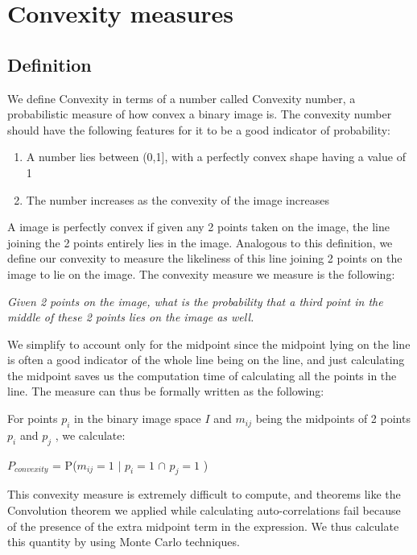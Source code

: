 \documentclass[12pt, a4paper]{report}
\begin{document}
\chapter{Convexity measures}

\section{Definition}
We define Convexity in terms of a number called Convexity number, a probabilistic measure of how convex a binary image is. The convexity number should have the following features for it to be a good indicator of probability:
\begin{enumerate}
    \item A number lies between (0,1], with a perfectly convex shape having a value of 1
    \item The number increases as the convexity of the image increases
\end{enumerate}

A image is perfectly convex if given any 2 points taken on the image, the line joining the 2 points entirely lies in the image. Analogous to this definition, we define our convexity to measure the likeliness of this line joining 2 points on the image to lie on the image. The convexity measure we measure is the following:

\textit{Given 2 points on the image, what is the probability that a third point in the middle of these 2 points lies on the image as well.}

We simplify to account only for the midpoint since the midpoint lying on the line is often a good indicator of the whole line being on the line, and just calculating the midpoint saves us the computation time of calculating all the points in the line. The measure can thus be formally written as the following:


For points $p_i$ in the binary image space $I$ and $m_{ij}$ being the midpoints of 2 points $p_i$ and $p_j$ , we calculate:


$P_{convexity}$ = P($m_{ij} = 1$ $|$ $p_i = 1$ $\cap$ $p_j = 1$ )

This convexity measure is extremely difficult to compute, and theorems like the Convolution theorem we applied while calculating auto-correlations fail because of the presence of the extra midpoint term in the expression. We thus calculate this quantity by using Monte Carlo techniques.
\end{document}
